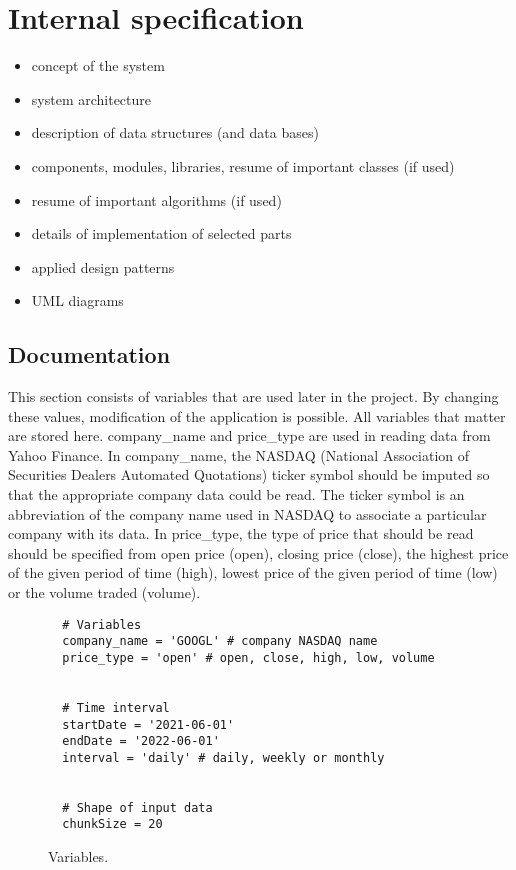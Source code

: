 \chapter{Internal specification}

\begin{itemize}
\item concept of the system
\item system architecture
\item description of data structures (and data bases)
\item components, modules, libraries, resume of important classes (if used)
\item resume of important algorithms (if used)
\item details of implementation of selected parts
\item applied design patterns
\item UML diagrams
\end{itemize}

\section*{Documentation}

This section consists of variables that are used later in the project. By changing these values, modification of the application is possible. All variables that matter are stored here. company{\_}name and price{\_}type are used in reading data from Yahoo Finance. In company{\_}name, the NASDAQ (National Association of Securities Dealers Automated Quotations) ticker symbol should be imputed so that the appropriate company data could be read. The ticker symbol is an abbreviation of the company name used in NASDAQ to associate a particular company with its data. In price{\_}type, the type of price that should be read should be specified from open price (open), closing price (close), the highest price of the given period of time (high), lowest price of the given period of time (low) or the volume traded (volume).

\clearpage
\begin{figure}
\centering
\begin{lstlisting}
  # Variables
  company_name = 'GOOGL' # company NASDAQ name
  price_type = 'open' # open, close, high, low, volume
  
  
  # Time interval
  startDate = '2021-06-01'
  endDate = '2022-06-01'
  interval = 'daily' # daily, weekly or monthly
  
  
  # Shape of input data
  chunkSize = 20
\end{lstlisting}
\caption{Variables.}
\label{fig:pseudocode:listings}
\end{figure}

